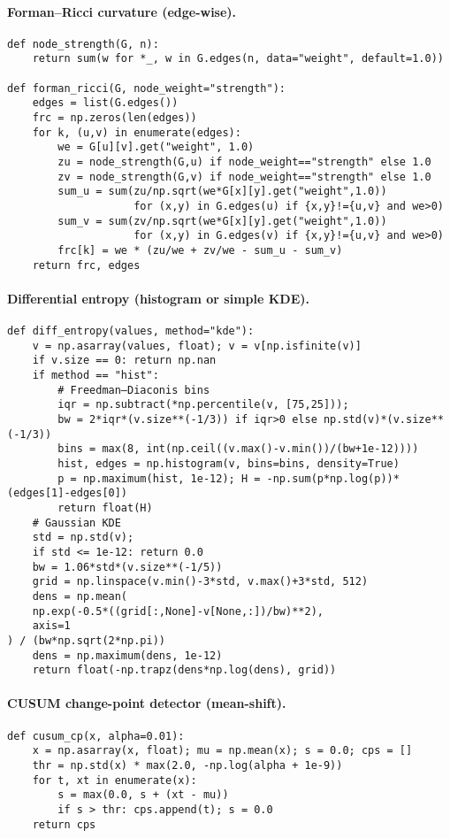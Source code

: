 \documentclass{article}
\theoremstyle{definition}
\begin{document}
\paragraph{Forman--Ricci curvature (edge-wise).}
\begin{verbatim}
def node_strength(G, n):
    return sum(w for *_, w in G.edges(n, data="weight", default=1.0))

def forman_ricci(G, node_weight="strength"):
    edges = list(G.edges())
    frc = np.zeros(len(edges))
    for k, (u,v) in enumerate(edges):
        we = G[u][v].get("weight", 1.0)
        zu = node_strength(G,u) if node_weight=="strength" else 1.0
        zv = node_strength(G,v) if node_weight=="strength" else 1.0
        sum_u = sum(zu/np.sqrt(we*G[x][y].get("weight",1.0))
                    for (x,y) in G.edges(u) if {x,y}!={u,v} and we>0)
        sum_v = sum(zv/np.sqrt(we*G[x][y].get("weight",1.0))
                    for (x,y) in G.edges(v) if {x,y}!={u,v} and we>0)
        frc[k] = we * (zu/we + zv/we - sum_u - sum_v)
    return frc, edges
\end{verbatim}

\paragraph{Differential entropy (histogram or simple KDE).}
\begin{verbatim}
def diff_entropy(values, method="kde"):
    v = np.asarray(values, float); v = v[np.isfinite(v)]
    if v.size == 0: return np.nan
    if method == "hist":
        # Freedman–Diaconis bins
        iqr = np.subtract(*np.percentile(v, [75,25])); 
        bw = 2*iqr*(v.size**(-1/3)) if iqr>0 else np.std(v)*(v.size**(-1/3))
        bins = max(8, int(np.ceil((v.max()-v.min())/(bw+1e-12))))
        hist, edges = np.histogram(v, bins=bins, density=True)
        p = np.maximum(hist, 1e-12); H = -np.sum(p*np.log(p))*(edges[1]-edges[0])
        return float(H)
    # Gaussian KDE
    std = np.std(v); 
    if std <= 1e-12: return 0.0
    bw = 1.06*std*(v.size**(-1/5))
    grid = np.linspace(v.min()-3*std, v.max()+3*std, 512)
    dens = np.mean(
    np.exp(-0.5*((grid[:,None]-v[None,:])/bw)**2),
    axis=1
) / (bw*np.sqrt(2*np.pi))
    dens = np.maximum(dens, 1e-12)
    return float(-np.trapz(dens*np.log(dens), grid))
\end{verbatim}

\paragraph{CUSUM change-point detector (mean-shift).}
\begin{verbatim}
def cusum_cp(x, alpha=0.01):
    x = np.asarray(x, float); mu = np.mean(x); s = 0.0; cps = []
    thr = np.std(x) * max(2.0, -np.log(alpha + 1e-9))
    for t, xt in enumerate(x):
        s = max(0.0, s + (xt - mu))
        if s > thr: cps.append(t); s = 0.0
    return cps
\end{verbatim}
\end{document}
